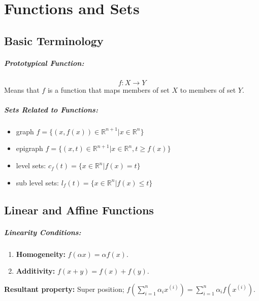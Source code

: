 \documentclass[a4paper,12pt]{report}
\def\reals{\mathbb{R}}
\begin{document}
\chapter{Functions and Sets}

\section{Basic Terminology}

\paragraph{Prototypical Function: } \begin{equation}
f:X\to Y
\end{equation}
Means that $f$ is a function that maps members of set $X$ to members of set $Y$.

\paragraph{Sets Related to Functions: } 
\begin{itemize}
\item graph $f = \{(x, f(x)) \in \reals^{n+1} | x \in \reals^n\}$
\item epigraph $f = \{(x, t) \in \reals^{n+1} | x \in \reals^n, t \geq f(x)\}$
\item level sets: $c_f(t) = \{x\in \reals^n | f(x) = t\}$
\item sub level sets: $l_f(t) = \{x\in\reals^n | f(x) \leq t\}$
\end{itemize}

\section{Linear and Affine Functions}

\paragraph{Linearity Conditions: } 
\begin{enumerate}
\item \textbf{Homogeneity: } $f(\alpha x) = \alpha f(x)$.
\item \textbf{Additivity: } $f(x+y) = f(x) + f(y)$.
\end{enumerate}

\textbf{Resultant property: } Super position; $f(\sum_{i=1}^{n} \alpha_i x^{(i)} ) = \sum_{i=1}^{n} \alpha_i f(x^{(i)})$.
\end{document}
